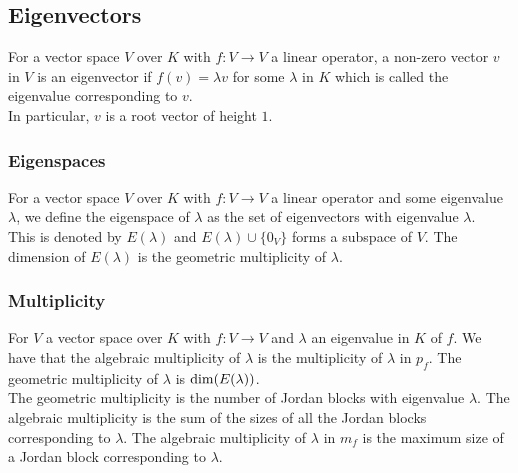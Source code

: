 \subsection{Eigenvectors}

For a vector space $V$ over $K$ with $f: V \to V$ a 
linear operator, a non-zero vector $v$ in $V$ is an eigenvector
if $f(v) = \lambda v$ for some $\lambda$ in $K$ which is
called the eigenvalue corresponding to $v$.
\\[\baselineskip]
In particular, $v$ is a root vector of height $1$.

\subsubsection{Eigenspaces}

For a vector space $V$ over $K$ with $f: V \to V$ a 
linear operator and some eigenvalue $\lambda$, we define the
eigenspace of $\lambda$ as the set of eigenvectors with eigenvalue
$\lambda$.
\\[\baselineskip]
This is denoted by $E(\lambda)$ and $E(\lambda)\cup\{0_{V}\}$ forms
a subspace of $V$. The dimension of $E(\lambda)$ is the geometric
multiplicity of $\lambda$.

\subsubsection{Multiplicity}

For $V$ a vector space over $K$ with $f : V \to V$ and $\lambda$ an 
eigenvalue in $K$ of $f$. We have that the algebraic multiplicity of
$\lambda$ is the multiplicity of $\lambda$ in $p_f$. The geometric
multiplicity of $\lambda$ is $\operatorname{dim}(E(\lambda))$.
\\[\baselineskip]
The geometric multiplicity is the number of Jordan blocks with eigenvalue $\lambda$.
The algebraic multiplicity is the sum of the sizes of all the Jordan blocks
corresponding to $\lambda$.
The algebraic multiplicity of $\lambda$ in $m_f$ is the maximum size of a
Jordan block corresponding to $\lambda$.
